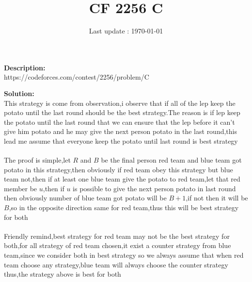 \documentclass{article}
\begin{document}
\title{\textbf{CF 2256 C}}
\author{}
\date{Last update : \today}

\maketitle

\noindent \textbf{Description:}\\
https://codeforces.com/contest/2256/problem/C

\noindent \textbf{Solution:}\\
This strategy is come from observation,i observe that if all of the lep keep the potato until the last round should be the best strategy.The reason is if lep keep the potato until the last round that we can ensure that the lep before it can't give him potato and he may give the next person potato in the last round,this lead me assume that everyone keep the potato until last round is best strategy\\
\\
The proof is simple,let $R$ and $B$ be the final person red team and blue team got potato in this strategy,then obviously if red team obey this strategy but blue team not,then if at least one blue team give the potato to red team,let that red member be $u$,then if $u$ is possible to give the next person potato in last round then obviously number of blue team got potato will be $B+1$,if not then it will be $B$,so in the opposite direction same for red team,thus this will be best strategy for both\\
\\
Friendly remind,best strategy for red team may not be the best strategy for both,for all strategy of red team chosen,it exist a counter strategy from blue team,since we consider both in best strategy so we always assume that when red team choose any strategy,blue team will always choose the counter strategy thus,the strategy above is best for both
\end{document}
